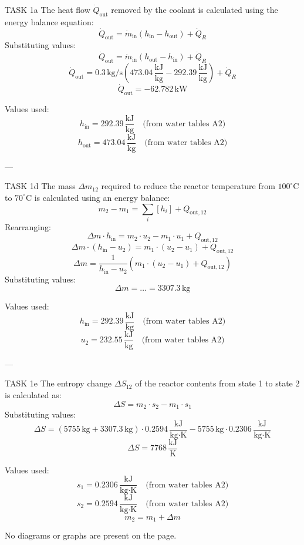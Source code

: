 TASK 1a  
The heat flow \( \dot{Q}_{\text{out}} \) removed by the coolant is calculated using the energy balance equation:  
\[
\dot{Q}_{\text{out}} = \dot{m}_{\text{in}} \left( h_{\text{in}} - h_{\text{out}} \right) + \dot{Q}_R
\]  
Substituting values:  
\[
\dot{Q}_{\text{out}} = \dot{m}_{\text{in}} \left( h_{\text{out}} - h_{\text{in}} \right) + \dot{Q}_R
\]  
\[
\dot{Q}_{\text{out}} = 0.3 \, \text{kg/s} \left( 473.04 \, \frac{\text{kJ}}{\text{kg}} - 292.39 \, \frac{\text{kJ}}{\text{kg}} \right) + \dot{Q}_R
\]  
\[
\dot{Q}_{\text{out}} = -62.782 \, \text{kW}
\]  

Values used:  
\[
h_{\text{in}} = 292.39 \, \frac{\text{kJ}}{\text{kg}} \quad \text{(from water tables A2)}
\]  
\[
h_{\text{out}} = 473.04 \, \frac{\text{kJ}}{\text{kg}} \quad \text{(from water tables A2)}
\]  

---

TASK 1d  
The mass \( \Delta m_{12} \) required to reduce the reactor temperature from \( 100^\circ\text{C} \) to \( 70^\circ\text{C} \) is calculated using an energy balance:  
\[
m_2 - m_1 = \sum_i \left[ h_i \right] + Q_{\text{out},12}
\]  
Rearranging:  
\[
\Delta m \cdot h_{\text{in}} = m_2 \cdot u_2 - m_1 \cdot u_1 + Q_{\text{out},12}
\]  
\[
\Delta m \cdot \left( h_{\text{in}} - u_2 \right) = m_1 \cdot \left( u_2 - u_1 \right) + Q_{\text{out},12}
\]  
\[
\Delta m = \frac{1}{h_{\text{in}} - u_2} \left( m_1 \cdot \left( u_2 - u_1 \right) + Q_{\text{out},12} \right)
\]  
Substituting values:  
\[
\Delta m = \dots = 3307.3 \, \text{kg}
\]  

Values used:  
\[
h_{\text{in}} = 292.39 \, \frac{\text{kJ}}{\text{kg}} \quad \text{(from water tables A2)}
\]  
\[
u_2 = 232.55 \, \frac{\text{kJ}}{\text{kg}} \quad \text{(from water tables A2)}
\]  

---

TASK 1e  
The entropy change \( \Delta S_{12} \) of the reactor contents from state 1 to state 2 is calculated as:  
\[
\Delta S = m_2 \cdot s_2 - m_1 \cdot s_1
\]  
Substituting values:  
\[
\Delta S = \left( 5755 \, \text{kg} + 3307.3 \, \text{kg} \right) \cdot 0.2594 \, \frac{\text{kJ}}{\text{kg·K}} - 5755 \, \text{kg} \cdot 0.2306 \, \frac{\text{kJ}}{\text{kg·K}}
\]  
\[
\Delta S = 7768 \, \frac{\text{kJ}}{\text{K}}
\]  

Values used:  
\[
s_1 = 0.2306 \, \frac{\text{kJ}}{\text{kg·K}} \quad \text{(from water tables A2)}
\]  
\[
s_2 = 0.2594 \, \frac{\text{kJ}}{\text{kg·K}} \quad \text{(from water tables A2)}
\]  
\[
m_2 = m_1 + \Delta m
\]  

No diagrams or graphs are present on the page.